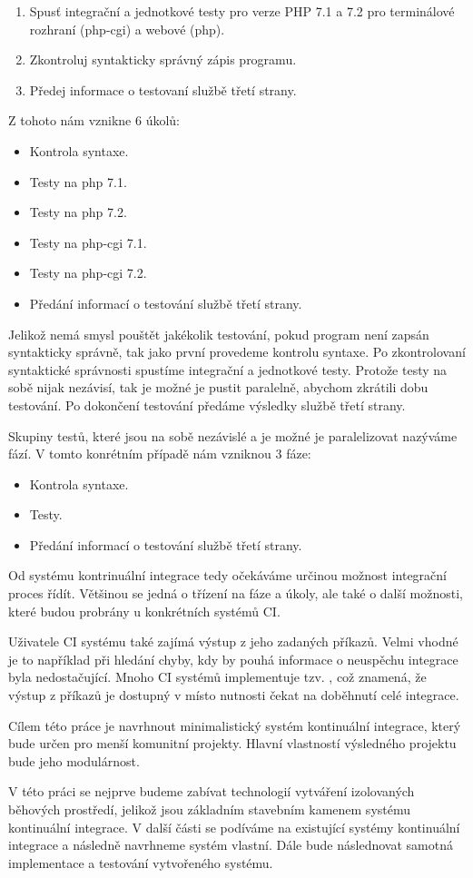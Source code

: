 \begin{enumerate}
	\item Spusť integrační a jednotkové testy pro verze PHP 7.1 a 7.2 pro terminálové rozhraní (php-cgi) a webové (php).
	\item Zkontroluj syntakticky správný zápis programu.
	\item Předej informace o testovaní službě třetí strany.
\end{enumerate}

Z tohoto nám vznikne 6 úkolů:

\begin{itemize}
	\item Kontrola syntaxe.
	\item Testy na php 7.1.
	\item Testy na php 7.2.
	\item Testy na php-cgi 7.1.
	\item Testy na php-cgi 7.2.
	\item Předání informací o testování službě třetí strany.
\end{itemize}

Jelikož nemá smysl pouštět jakékolik testování, pokud program není zapsán syntakticky správně, tak jako první provedeme kontrolu syntaxe.
Po zkontrolovaní syntaktické správnosti spustíme integrační a jednotkové testy.
Protože testy na sobě nijak nezávisí, tak je možné je pustit paralelně, abychom zkrátili dobu testování.
Po dokončení testování předáme výsledky službě třetí strany.

Skupiny testů, které jsou na sobě nezávislé a je možné je paralelizovat nazýváme fází.
V tomto konrétním případě nám vzniknou 3 fáze:

\begin{itemize}
	\item Kontrola syntaxe.
	\item Testy.
	\item Předání informací o testování službě třetí strany.
\end{itemize}

Od systému kontrinuální integrace tedy očekáváme určinou možnost integrační proces řídít.
Většinou se jedná o třízení na fáze a úkoly, ale také o další možnosti, které budou probrány u konkrétních systémů CI.

Uživatele CI systému také zajímá výstup z jeho zadaných příkazů.
Velmi vhodné je to například při hledání chyby, kdy by pouhá informace o neuspěchu integrace byla nedostačující.
Mnoho CI systémů implementuje tzv. , což znamená, že výstup z příkazů je dostupný v  místo nutnosti čekat na doběhnutí celé integrace.

Cílem této práce je navrhnout minimalistický systém kontinuální integrace, který bude určen pro menší komunitní projekty.
Hlavní vlastností výsledného projektu bude jeho modulárnost.

V této práci se nejprve budeme zabívat technologií vytváření izolovaných běhových prostředí, jelikož jsou základním stavebním kamenem systému kontinuální integrace.
V další části se podíváme na existující systémy kontinuální integrace a následně navrhneme systém vlastní.
Dále bude následnovat samotná implementace a testování vytvořeného systému.

